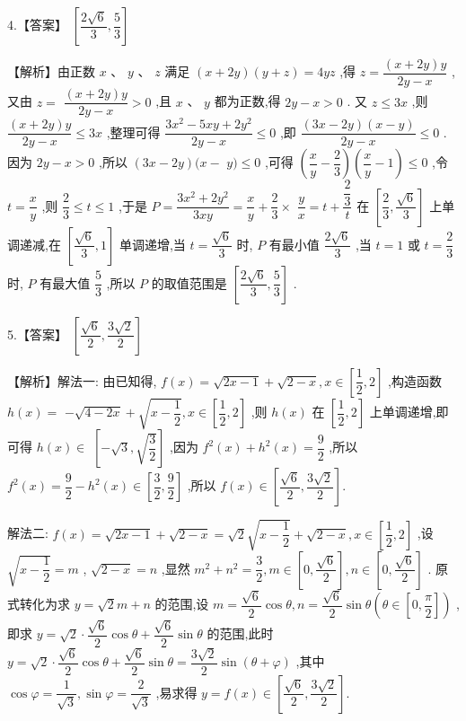 \documentclass[10pt]{article}
\begin{document}
4.【答案】 $\left\lbrack  {\dfrac{2\sqrt{6}}{3},\dfrac{5}{3}}\right\rbrack$

【解析】由正数 $x\text{ 、 }y\text{ 、 }z$ 满足 $\left( {x + {2y}}\right) \left( {y + z}\right)  = {4yz}$ ,得 $z = \dfrac{\left( {x + {2y}}\right) y}{{2y} - x}$ ,又由 $z =$  $\dfrac{\left( {x + {2y}}\right) y}{{2y} - x} > 0$ ,且 $x$ 、 $y$ 都为正数,得 ${2y} - x > 0$ . 又 $z \leq  {3x}$ ,则 $\dfrac{\left( {x + {2y}}\right) y}{{2y} - x} \leq  {3x}$ ,整理可得 $\dfrac{3{x}^{2} - {5xy} + 2{y}^{2}}{{2y} - x} \leq  0$ ,即 $\dfrac{\left( {{3x} - {2y}}\right) \left( {x - y}\right) }{{2y} - x} \leq  0$ . 因为 ${2y} - x > 0$ ,所以 $\left( {{3x} - {2y}}\right) (x -$  $y) \leq  0$ ,可得 $\left( {\dfrac{x}{y} - \dfrac{2}{3}}\right) \left( {\dfrac{x}{y} - 1}\right)  \leq  0$ ,令 $t = \dfrac{x}{y}$ ,则 $\dfrac{2}{3} \leq  t \leq  1$ ,于是 $P = \dfrac{3{x}^{2} + 2{y}^{2}}{3xy} = \dfrac{x}{y} + \dfrac{2}{3} \times$  $\dfrac{y}{x} = t + \dfrac{\dfrac{2}{3}}{t}$ 在 $\left\lbrack  {\dfrac{2}{3},\dfrac{\sqrt{6}}{3}}\right\rbrack$ 上单调递减,在 $\left\lbrack  {\dfrac{\sqrt{6}}{3},1}\right\rbrack$ 单调递增,当 $t = \dfrac{\sqrt{6}}{3}$ 时, $P$ 有最小值 $\dfrac{2\sqrt{6}}{3}$ ,当 $t = 1$ 或 $t = \dfrac{2}{3}$ 时, $P$ 有最大值 $\dfrac{5}{3}$ ,所以 $P$ 的取值范围是 $\left\lbrack  {\dfrac{2\sqrt{6}}{3},\dfrac{5}{3}}\right\rbrack$ .

5.【答案】 $\left\lbrack  {\dfrac{\sqrt{6}}{2},\dfrac{3\sqrt{2}}{2}}\right\rbrack$

【解析】解法一: 由已知得, $f\left( x\right)  = \sqrt{{2x} - 1} + \sqrt{2 - x},x \in  \left\lbrack  {\dfrac{1}{2},2}\right\rbrack$ ,构造函数 $h\left( x\right)  =$  $- \sqrt{4 - {2x}} + \sqrt{x - \dfrac{1}{2}},x \in  \left\lbrack  {\dfrac{1}{2},2}\right\rbrack$ ,则 $h\left( x\right)$ 在 $\left\lbrack  {\dfrac{1}{2},2}\right\rbrack$ 上单调递增,即可得 $h\left( x\right)  \in$  $\left\lbrack  {-\sqrt{3},\sqrt{\dfrac{3}{2}}}\right\rbrack$ ,因为 ${f}^{2}\left( x\right)  + {h}^{2}\left( x\right)  = \dfrac{9}{2}$ ,所以 ${f}^{2}\left( x\right)  = \dfrac{9}{2} - {h}^{2}\left( x\right)  \in  \left\lbrack  {\dfrac{3}{2},\dfrac{9}{2}}\right\rbrack$ ,所以 $f\left( x\right)  \in  \left\lbrack  {\dfrac{\sqrt{6}}{2},\dfrac{3\sqrt{2}}{2}}\right\rbrack  .$

解法二: $f\left( x\right)  = \sqrt{{2x} - 1} + \sqrt{2 - x} = \sqrt{2}\sqrt{x - \dfrac{1}{2}} + \sqrt{2 - x},x \in  \left\lbrack  {\dfrac{1}{2},2}\right\rbrack$ ,设 $\sqrt{x - \dfrac{1}{2}} = m$ , $\sqrt{2 - x} = n$ ,显然 ${m}^{2} + {n}^{2} = \dfrac{3}{2},m \in  \left\lbrack  {0,\dfrac{\sqrt{6}}{2}}\right\rbrack  ,n \in  \left\lbrack  {0,\dfrac{\sqrt{6}}{2}}\right\rbrack$ . 原式转化为求 $y = \sqrt{2}m + n$ 的范围,设 $m = \dfrac{\sqrt{6}}{2}\cos \theta ,n = \dfrac{\sqrt{6}}{2}\sin \theta \left( {\theta  \in  \left\lbrack  {0,\dfrac{\pi }{2}}\right\rbrack  }\right)$ ,即求 $y = \sqrt{2} \cdot  \dfrac{\sqrt{6}}{2}\cos \theta  + \dfrac{\sqrt{6}}{2}\sin \theta$ 的范围,此时 $y = \sqrt{2} \cdot  \dfrac{\sqrt{6}}{2}\cos \theta  + \dfrac{\sqrt{6}}{2}\sin \theta  = \dfrac{3\sqrt{2}}{2}\sin \left( {\theta  + \varphi }\right)$ ,其中 $\cos \varphi  = \dfrac{1}{\sqrt{3}},\sin \varphi  = \dfrac{2}{\sqrt{3}}$ ,易求得 $y = f\left( x\right)  \in  \left\lbrack  {\dfrac{\sqrt{6}}{2},\dfrac{3\sqrt{2}}{2}}\right\rbrack  .$
\end{document}
